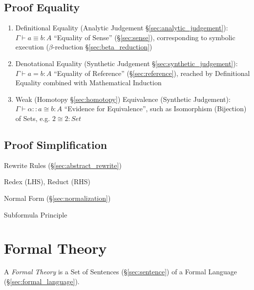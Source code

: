 \subsection{Proof Equality}\label{sec:proof_equality}
\cite{harper12}

\begin{enumerate}
  \item Definitional Equality (Analytic Judgement
    \S\ref{sec:analytic_judgement}): $\Gamma \vdash a \equiv b : A$
    ``Equality of Sense'' (\S\ref{sec:sense}), corresponding to
    symbolic execution ($\beta$-reduction \S\ref{sec:beta_reduction})
  \item Denotational Equality (Synthetic Judgement
    \S\ref{sec:synthetic_judgement}): $\Gamma \vdash a = b : A$
    ``Equality of Reference'' (\S\ref{sec:reference}), reached by
    Definitional Equality combined with Mathematical Induction
  \item Weak (Homotopy \S\ref{sec:homotopy}) Equivalence (Synthetic
    Judgement): $\Gamma \vdash \alpha :: a \cong b : A$ ``Evidence for
    Equivalence'', such as Isomorphism (Bijection) of Sets, e.g. $2
    \cong 2 : Set$
\end{enumerate}



\subsection{Proof Simplification}\label{sec:proof_simplification}

Rewrite Rules (\S\ref{sec:abstract_rewrite})

Redex (LHS), Reduct (RHS)

Normal Form (\S\ref{sec:normalization})

Subformula Principle



\section{Formal Theory}\label{sec:formal_theory}

A \emph{Formal Theory} is a Set of Sentences (\S\ref{sec:sentence}) of
a Formal Language (\S\ref{sec:formal_language}).


